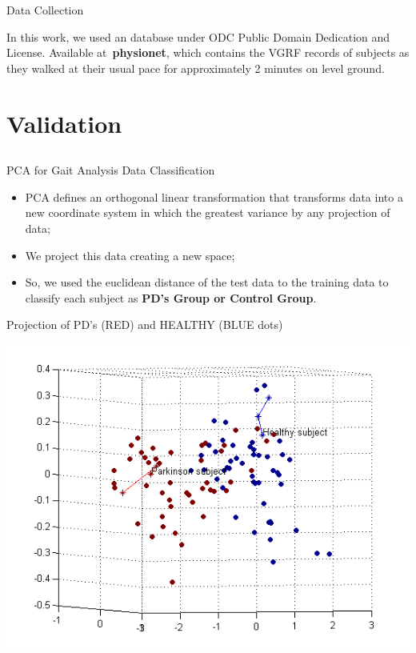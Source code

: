 \documentclass{beamer}
\begin{document}

\begin{frame}{Data Collection}
	\begin{block}{}
	In this work, we used an database under ODC Public Domain Dedication and License. Available at~\textbf{physionet}, which contains the VGRF records of subjects as they walked at their usual pace for approximately 2 minutes on level ground. 
	\end{block}
\end{frame}

\section{Validation}
\subsection{}
\begin{frame}{PCA for Gait Analysis Data Classification}
	\begin{block}{}
		\begin{itemize}[<+->]
			\item PCA defines an orthogonal linear transformation that transforms data into a new coordinate system in which the greatest variance by any projection of data;
			\item We project this data creating a new space;
			\item So, we used the euclidean distance of the test data to the training data to classify each subject as \textbf{PD's Group or Control Group}.
		\end{itemize}
	\end{block}
\end{frame}


\begin{frame}{Projection of PD's (RED) and HEALTHY (BLUE dots)}
	\begin{block}{}
		\begin{center}
				\includegraphics[height=2.6 in]{img/pca-projection-health-parkinson.png}
		\end{center}
	\end{block}
\end{frame}
\end{document}
